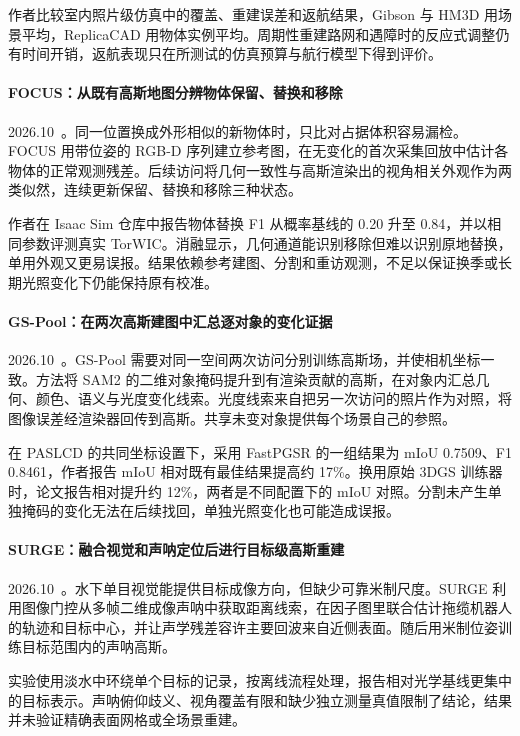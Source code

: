 作者比较室内照片级仿真中的覆盖、重建误差和返航结果，Gibson 与 HM3D 用场景平均，ReplicaCAD 用物体实例平均。周期性重建路网和遇障时的反应式调整仍有时间开销，返航表现只在所测试的仿真预算与航行模型下得到评价。

\paragraph{FOCUS：从既有高斯地图分辨物体保留、替换和移除}
2026.10~\cite{2610_05639}。同一位置换成外形相似的新物体时，只比对占据体积容易漏检。FOCUS 用带位姿的 RGB-D 序列建立参考图，在无变化的首次采集回放中估计各物体的正常观测残差。后续访问将几何一致性与高斯渲染出的视角相关外观作为两类似然，连续更新保留、替换和移除三种状态。

作者在 Isaac Sim 仓库中报告物体替换 F1 从概率基线的 0.20 升至 0.84，并以相同参数评测真实 TorWIC。消融显示，几何通道能识别移除但难以识别原地替换，单用外观又更易误报。结果依赖参考建图、分割和重访观测，不足以保证换季或长期光照变化下仍能保持原有校准。

\paragraph{GS-Pool：在两次高斯建图中汇总逐对象的变化证据}
2026.10~\cite{2610_06688}。GS-Pool 需要对同一空间两次访问分别训练高斯场，并使相机坐标一致。方法将 SAM2 的二维对象掩码提升到有渲染贡献的高斯，在对象内汇总几何、颜色、语义与光度变化线索。光度线索来自把另一次访问的照片作为对照，将图像误差经渲染器回传到高斯。共享未变对象提供每个场景自己的参照。

在 PASLCD 的共同坐标设置下，采用 FastPGSR 的一组结果为 mIoU 0.7509、F1 0.8461，作者报告 mIoU 相对既有最佳结果提高约 17\%。换用原始 3DGS 训练器时，论文报告相对提升约 12\%，两者是不同配置下的 mIoU 对照。分割未产生单独掩码的变化无法在后续找回，单独光照变化也可能造成误报。

\paragraph{SURGE：融合视觉和声呐定位后进行目标级高斯重建}
2026.10~\cite{2610_07472}。水下单目视觉能提供目标成像方向，但缺少可靠米制尺度。SURGE 利用图像门控从多帧二维成像声呐中获取距离线索，在因子图里联合估计拖缆机器人的轨迹和目标中心，并让声学残差容许主要回波来自近侧表面。随后用米制位姿训练目标范围内的声呐高斯。

实验使用淡水中环绕单个目标的记录，按离线流程处理，报告相对光学基线更集中的目标表示。声呐俯仰歧义、视角覆盖有限和缺少独立测量真值限制了结论，结果并未验证精确表面网格或全场景重建。

